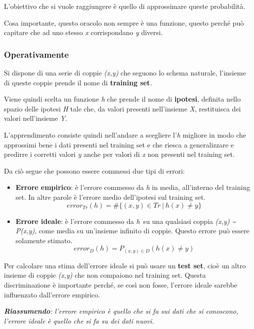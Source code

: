 L'obiettivo che si vuole raggiungere è quello di approssimare queste
probabilità.

Cosa importante, questo oracolo non sempre è una funzione, questo perché
può capitare che ad uno stesso \emph{x} corrispondano \emph{y} diversi.

\subsubsection{Operativamente}\label{operativamente}

Si dispone di una serie di coppie \emph{(x,y)} che seguono lo schema naturale, l'insieme di queste coppie prende il nome di \textbf{training set}.

Viene quindi scelta un funzione \emph{h} che prende il nome di
\textbf{ipotesi}, definita nello spazio delle ipotesi \emph{H} tale che,
da valori presenti nell'insieme \emph{X}, restituisca dei valori
nell'insieme \emph{Y}.

L'apprendimento consiste quindi nell'andare a scegliere l'\emph{h}
migliore in modo che approssimi bene i dati presenti nel training set e
che riesca a generalizzare e predirre i corretti valori \emph{y} anche
per valori di \emph{x} non presenti nel training set.

Da ciò segue che possono essere commessi due tipi di errori:

\begin{itemize}
\item
  \textbf{Errore empirico}: è l'errore commesso da \emph{h} in media,
  all'interno del training set. In altre parole è l'errore medio
  dell'ipotesi sul training set.
  $$
  error_{Tr}(h) = \#\{(x,y) \in Tr \: | \: h(x) \neq y\}
  $$
\item
  \textbf{Errore ideale}: è l'errore commesso da \emph{h}~su una
  qualsiasi coppia \emph{(x,y) \textasciitilde{} P(x,y)}, come media su
  un'insieme infinito di coppie. Questo errore può essere solamente
  stimato.
  $$
  error_D(h) = P_{(x,y) \in D}(h(x) \neq y)
  $$
\end{itemize}

Per calcolare una stima dell'errore ideale si può usare un \textbf{test
set}, cioè un altro insieme di coppie \emph{(x,y)} che non compaiono nel
training set. Questa discriminazione è importante perché, se così non
fosse, l'errore ideale sarebbe influenzato dall'errore empirico.

\emph{\textbf{Riassumendo}: l'errore empirico è quello che si fa sui dati che si
conoscono, l'errore ideale è quello che si fa su dei dati nuovi.}

